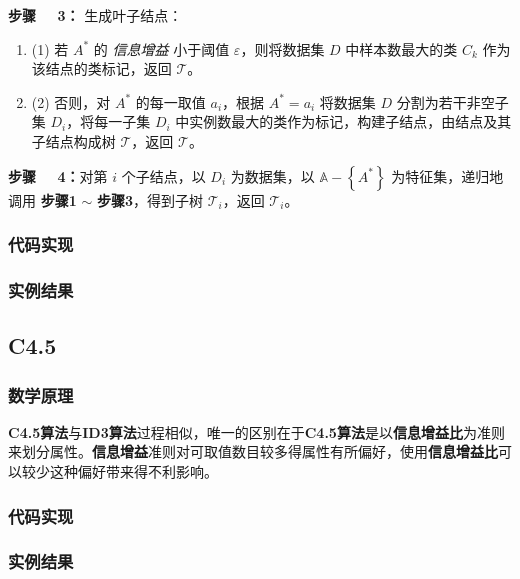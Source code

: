 \documentclass{ctexart}
\numberwithin{equation}{section}
\begin{document}
\textbf{步骤 \ \ 3：} 生成叶子结点：
\begin{enumerate}[\qquad ]
	\item (1) 若 $A^{*}$ 的 \emph{信息增益} 小于阈值 $\varepsilon$，则将数据集 $D$ 中样本数最大的类 $C_k$ 作为该结点的类标记，返回 $\mathscr{T}$。
	
	\item (2) 否则，对 $A^{*}$ 的每一取值 $a_i$，根据 $A^* = a_i$ 将数据集 $D$ 分割为若干非空子集 $D_i$，将每一子集 $D_i$ 中实例数最大的类作为标记，构建子结点，由结点及其子结点构成树 $\mathscr{T}$，返回 $\mathscr{T}$。
\end{enumerate}

\textbf{步骤 \ \ 4：}对第 $i$ 个子结点，以 $D_i$ 为数据集，以 $\mathbb{A} - \left\{ A^* \right\}$ 为特征集，递归地调用 \textbf{步骤1} $\sim$ \textbf{步骤3}，得到子树 $\mathscr{T}_i$，返回 $\mathscr{T}_i$。


\subsubsection{代码实现}

\subsubsection{实例结果}


\subsection{C4.5}

\subsubsection{数学原理}

\textbf{C4.5算法}与\textbf{ID3算法}过程相似，唯一的区别在于\textbf{C4.5算法}是以\textbf{信息增益比}为准则来划分属性。\textbf{信息增益}准则对可取值数目较多得属性有所偏好，使用\textbf{信息增益比}可以较少这种偏好带来得不利影响。

\subsubsection{代码实现}

\subsubsection{实例结果}


\end{document}
